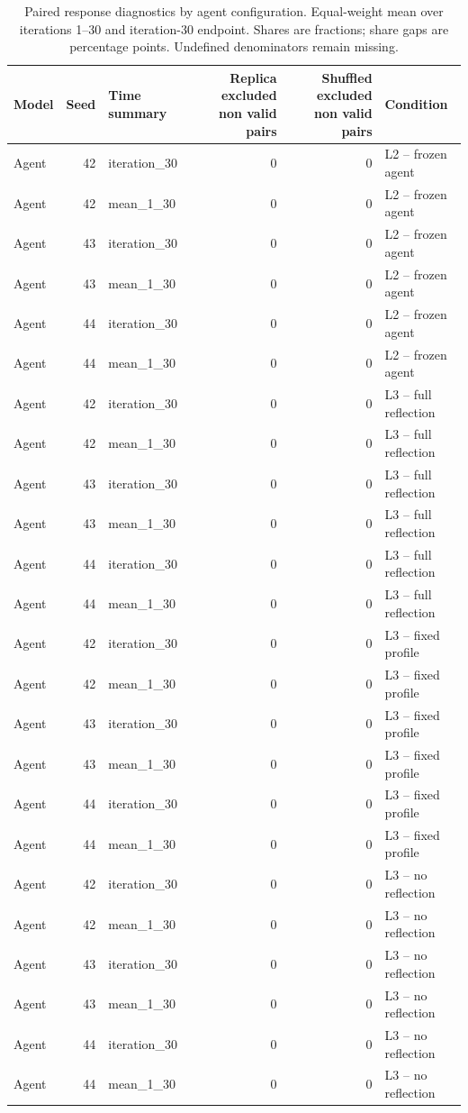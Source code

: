 \begin{table}[htbp!]
\centering
\small
\setlength{\tabcolsep}{3pt}
\renewcommand{\arraystretch}{1.1}
\begin{tabular}{lrlrrl}
\hline
Model & Seed & Time summary & Replica excluded non valid pairs & Shuffled excluded non valid pairs & Condition \\
\hline
Agent & 42 & iteration\_30 & 0 & 0 & L2 -- frozen agent \\
Agent & 42 & mean\_1\_30 & 0 & 0 & L2 -- frozen agent \\
Agent & 43 & iteration\_30 & 0 & 0 & L2 -- frozen agent \\
Agent & 43 & mean\_1\_30 & 0 & 0 & L2 -- frozen agent \\
Agent & 44 & iteration\_30 & 0 & 0 & L2 -- frozen agent \\
Agent & 44 & mean\_1\_30 & 0 & 0 & L2 -- frozen agent \\
Agent & 42 & iteration\_30 & 0 & 0 & L3 -- full reflection \\
Agent & 42 & mean\_1\_30 & 0 & 0 & L3 -- full reflection \\
Agent & 43 & iteration\_30 & 0 & 0 & L3 -- full reflection \\
Agent & 43 & mean\_1\_30 & 0 & 0 & L3 -- full reflection \\
Agent & 44 & iteration\_30 & 0 & 0 & L3 -- full reflection \\
Agent & 44 & mean\_1\_30 & 0 & 0 & L3 -- full reflection \\
Agent & 42 & iteration\_30 & 0 & 0 & L3 -- fixed profile \\
Agent & 42 & mean\_1\_30 & 0 & 0 & L3 -- fixed profile \\
Agent & 43 & iteration\_30 & 0 & 0 & L3 -- fixed profile \\
Agent & 43 & mean\_1\_30 & 0 & 0 & L3 -- fixed profile \\
Agent & 44 & iteration\_30 & 0 & 0 & L3 -- fixed profile \\
Agent & 44 & mean\_1\_30 & 0 & 0 & L3 -- fixed profile \\
Agent & 42 & iteration\_30 & 0 & 0 & L3 -- no reflection \\
Agent & 42 & mean\_1\_30 & 0 & 0 & L3 -- no reflection \\
Agent & 43 & iteration\_30 & 0 & 0 & L3 -- no reflection \\
Agent & 43 & mean\_1\_30 & 0 & 0 & L3 -- no reflection \\
Agent & 44 & iteration\_30 & 0 & 0 & L3 -- no reflection \\
Agent & 44 & mean\_1\_30 & 0 & 0 & L3 -- no reflection \\
\hline
\end{tabular}
\caption{Paired response diagnostics by agent configuration. Equal-weight mean over iterations 1--30 and iteration-30 endpoint. Shares are fractions; share gaps are percentage points. Undefined denominators remain missing.}
\label{chap:results:tab:rq3_agents_excluded_pairs}
\end{table}
